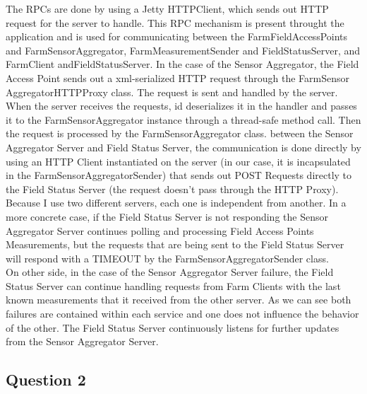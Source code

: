 \documentclass{article}      %
\begin{document}
The RPCs are done by using a Jetty HTTPClient, which sends out HTTP request for the server to handle. This RPC mechanism is present throught the application and is used for communicating between the FarmFieldAccessPoints and FarmSensorAggregator, FarmMeasurementSender and FieldStatusServer, and FarmClient andFieldStatusServer. In the case of the Sensor Aggregator, the Field Access Point sends out a xml-serialized HTTP request through the FarmSensor AggregatorHTTPProxy class. The request is sent and handled by the server. When the server receives the requests, id deserializes it in the handler and passes it to the FarmSensorAggregator instance through a thread-safe method call. Then the request is processed by the FarmSensorAggregator class. between the Sensor Aggregator Server and Field Status Server, the communication is done directly by using an HTTP Client instantiated on the server (in our case, it is incapsulated in the FarmSensorAggregatorSender) that sends out POST Requests directly to the Field Status Server (the request doesn't pass through the HTTP Proxy).\\

Because I use two different servers, each one is independent from another. In a more concrete case, if the Field Status Server is not responding the Sensor Aggregator Server continues polling and processing Field Access Points Measurements, but the requests that are being sent to the Field Status Server will respond with a TIMEOUT by the FarmSensorAggregatorSender class.\\

On other side, in the case of the Sensor Aggregator Server failure, the Field Status Server can continue handling requests from Farm Clients with the last known measurements that it received from the other server. As we can see both failures are contained within each service and one does not influence the behavior of the other. The Field Status Server continuously listens for further updates from the Sensor Aggregator Server.\\

\subsection* {Question 2}
\end{document}
